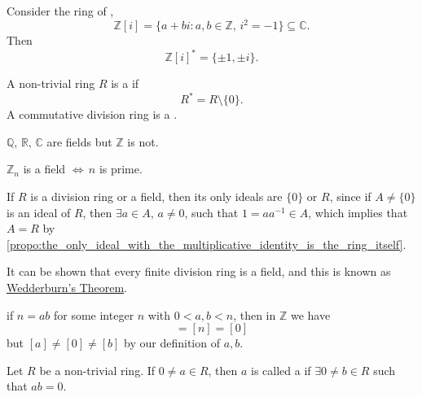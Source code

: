 \begin{eg}
  Consider the ring of ,
  \begin{equation*}
    \mathbb{Z}[i] = \{a + bi : a, b \in \mathbb{Z}, \, i^2 = -1 \} \subseteq \mathbb{C}.
  \end{equation*}
  Then
  \begin{equation*}
    \mathbb{Z}[i]^* = \{ \pm 1, \pm i \}.
  \end{equation*}
\end{eg}

\begin{defn}
\label{defn:division_ring_and_field}
  A non-trivial ring $R$ is a  if
  \begin{equation*}
    R^* = R \setminus \{0\}.
  \end{equation*}
  A commutative division ring is a .
\end{defn}

\begin{eg}
  $\mathbb{Q}, \, \mathbb{R}, \, \mathbb{C}$ are fields but $\mathbb{Z}$ is not.
\end{eg}

\begin{eg}
  $\mathbb{Z}_n$ is a field $\iff \, n$ is prime.
\end{eg}

\begin{remark}
 If $R$ is a division ring or a field, then its only ideals are $\{0\}$ or $R$, since if $A \neq \{0\}$ is an ideal of $R$, then $\exists a \in A$, $a \neq 0$, such that $1 = aa^{-1} \in A$, which implies that $A = R$ by \cref{propo:the_only_ideal_with_the_multiplicative_identity_is_the_ring_itself}.
\end{remark}

\begin{remark}
  It can be shown that every finite division ring is a field, and this is known as \href{https://en.wikipedia.org/wiki/Wedderburn_Theorem}{Wedderburn's Theorem}.
\end{remark}

 if $n = ab$ for some integer $n$ with $0 < a, b < n$, then in $\mathbb{Z}$ we have
\begin{equation*}
  [a][b] = [n] = [0]
\end{equation*}
but $[a] \neq [0] \neq [b]$ by our definition of $a, b$.

\begin{defn}
\label{defn:zero_divisor}
  Let $R$ be a non-trivial ring. If $0 \neq a \in R$, then $a$ is called a  if $\exists 0 \neq b \in R$ such that $ab = 0$.
\end{defn}



